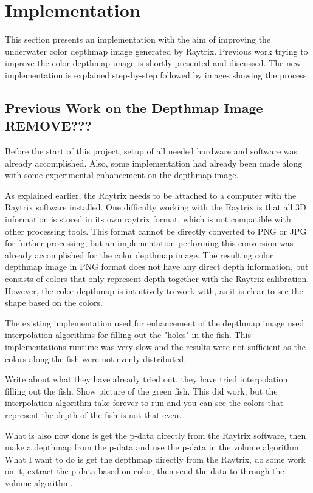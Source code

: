 \section{Implementation}\label{implementation}

This section presents an implementation with the aim of improving the underwater color depthmap image generated by Raytrix. Previous work trying to improve the color depthmap image is shortly presented and discussed. The new implementation is explained step-by-step followed by images showing the process.


\subsection{Previous Work on the Depthmap Image {\color{red}REMOVE???}}

Before the start of this project, setup of all needed hardware and software was already accomplished. Also, some implementation had already been made along with some experimental enhancement on the depthmap image.

As explained earlier, the Raytrix needs to be attached to a computer with the Raytrix software installed. One difficulty working with the Raytrix is that all 3D information is stored in its own raytrix format, which is not compatible with other processing tools. This format cannot be directly converted to PNG or JPG for further processing, but an implementation performing this conversion was already accomplished for the color depthmap image. The resulting color depthmap image in PNG format does not have any direct depth information, but consists of colors that only represent depth together with the Raytrix calibration.
However, the color depthmap is intuitively to work with, as it is clear to see the shape based on the colors.

The existing implementation used for enhancement of the depthmap image used interpolation algorithms for filling out the "holes" in the fish. This implementations runtime was very slow and the results were not sufficient as the colors along the fish were not evenly distributed.



{\color{red}
Write about what they have already tried out. 
they have tried interpolation filling out the fish. Show picture of the green fish. 
This did work, but the interpolation algorithm take forever to run and you can see the colors that represent the depth of the fish is not that even.

What is also now done is get the p-data directly from the Raytrix software, then make a depthmap from the p-data and use the p-data in the volume algorithm. What I want to do is get the depthmap directly from the Raytrix, do some work on it, extract the p-data based on color, then send the data to through the volume algorithm. 
}

